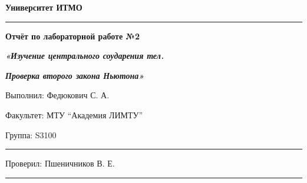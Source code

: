\documentclass[12pt]{article}
\begin{document}
\pagestyle{empty}
\begin{center}
\large{\textbf{Университет ИТМО}}
\end{center}
\rule{500pt}{1pt}
\par\bigskip\par\bigskip\par\bigskip\par\bigskip\par\bigskip\par\bigskip\par\bigskip\par\bigskip
\begin{center}
\Large
\textbf{Отчёт по лабораторной работе №2}

\textbf{\textit{«Изучение центрального соударения тел.}}

\textbf{\textit{Проверка второго закона Ньютона»}}
\end{center}
\par\bigskip\par\bigskip\par\bigskip\par\bigskip\par\bigskip\par\bigskip\par\bigskip\par\bigskip\par\bigskip\par\bigskip\par\bigskip\par\bigskip\par\bigskip\par\bigskip      
\begin{flushright}
\large
Выполнил: Федюкович С. А.
\par\bigskip
Факультет: МТУ “Академия ЛИМТУ”
\par\bigskip
Группа: S3100                       
\par\bigskip\par\bigskip\par\bigskip

\rule{150pt}{0.5pt}
\par\bigskip\par\bigskip\par\bigskip\par\bigskip                                                            
 Проверил: Пшеничников В. Е. 
\par\bigskip \par\bigskip

\rule{150pt}{0.5pt}
\end{flushright}
\end{document}
